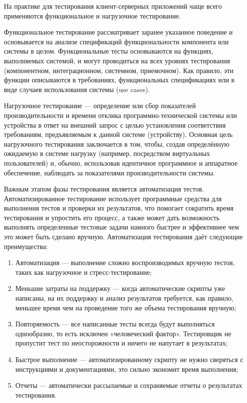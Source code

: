 На практике для тестирования клиент-серверных приложений чаще всего применяются функциональное и нагрузочное
тестирование.

Функциональное тестирование рассматривает заранее указанное поведение и основывается на анализе спецификаций
функциональности компонента или системы в целом. Функциональные тесты основываются на функциях, выполняемых системой,
и могут проводиться на всех уровнях тестирования (компонентном, интеграционном, системном, приемочном). Как правило,
эти функции описываются в требованиях, функциональных спецификациях или в виде случаев использования системы
(use cases).

Нагрузочное тестирование — определение или сбор показателей производительности и времени отклика
программно-технической системы или устройства в ответ на внешний запрос с целью установления соответствия требованиям,
предъявляемым к данной системе (устройству). Основная цель нагрузочного тестирования заключается в том, чтобы, создав
определённую ожидаемую в системе нагрузку (например, посредством виртуальных пользователей) и, обычно, использовав
идентичное программное и аппаратное обеспечение, наблюдать за показателями производительности системы.

Важным этапом фазы тестирования является автоматизация тестов. Автоматизированное тестирование использует программные средства для
выполнения тестов и проверки их результатов, что помогает сократить
время тестирования и упростить его процесс, а также может 
дать возможность выполнять определенные тестовые задачи намного быстрее и 
эффективнее чем это может быть сделано вручную. Автоматизация тестирования 
даёт следующие преимущества\cite{dot-com}:

\begin{enumerate}
\item Автоматизация --- выполнение сложно воспроизводимых вручную тестов, таких как нагрузочное
и стресс-тестирование;
\item Меньшие затраты на поддержку --- когда автоматические скрипты уже написаны, на их поддержку
и анализ результатов требуется, как правило, меньшее время чем на проведение того же объема тестирования вручную;
\item Повторяемость --- все написанные тесты всегда будут выполняться однообразно, то есть
исключен «человеческий фактор». Тестировщик не пропустит тест по неосторожности и ничего не
напутает в результатах;
\item Быстрое выполнение --- автоматизированному скрипту не нужно сверяться с инструкциями и
документациями, это сильно экономит время выполнения;
\item Отчеты --- автоматически рассылаемые и сохраняемые отчеты о результатах тестирования.
\end{enumerate}

